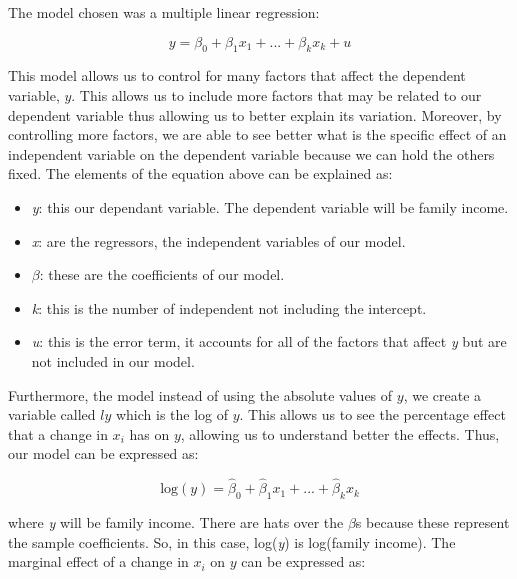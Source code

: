 \documentclass[12pt]{article}
\begin{document}
\begin{spacing}{1.5}

The model chosen was a multiple linear regression:

\begin{equation}
	y = {\beta}_{0} + {\beta}_{1} {x}_{1} + ... + {\beta}_{k} {x}_{k} + u
\end{equation}

This model allows us to control for many factors that affect the dependent variable, $ y $. This allows us to include more factors that may be related to our dependent variable thus allowing us to better explain its variation. Moreover, by controlling more factors, we are able to see better what is the specific effect of an independent variable on the dependent variable because we can hold the others fixed. The elements of the equation above can be explained as:

\begin{itemize}
	\item \textit{y}: this our dependant variable. The dependent variable will be family income.
	\item \textit{x}: are the regressors, the independent variables of our model.
	\item $ \beta $: these are the coefficients of our model.
	\item \textit{k}: this is the number of independent not including the intercept.
	\item \textit{u}: this is the error term, it accounts for all of the factors that affect \textit{y} but are not included in our model.
\end{itemize}

Furthermore, the model instead of using the absolute values of $ y $, we create a variable called $ ly $ which is the log of $ y $. This allows us to see the percentage effect that a change in $ x_i $ has on $ y $, allowing us to understand better the effects. Thus, our model can be expressed as:

\begin{equation}
	\mbox{log}(y) = {\widehat{\beta}}_{0} + {\widehat{\beta}}_{1} {x}_{1} + ... + {\widehat{\beta}}_{k} {x}_{k}
\end{equation}

where \textit{y} will be family income. There are hats over the $ \beta $s because these represent the sample coefficients. So, in this case, log(\textit{y}) is log(family income). The marginal effect of a change in $ {x}_{i} $ on $ y $ can be expressed as:


\end{spacing}
\end{document}
